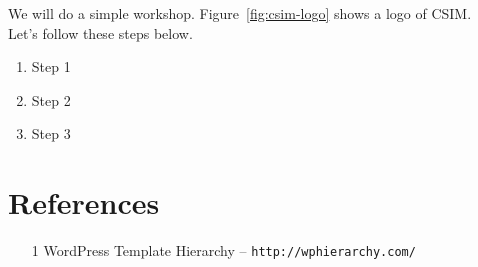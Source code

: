\documentclass{article}
\begin{document}
\noindent We will do a simple workshop. Figure~\ref{fig:csim-logo} shows
a logo of CSIM. \\

\noindent Let's follow these steps below.

\begin{enumerate}
    \item Step 1
    \item Step 2
    \item Step 3
\end{enumerate}

\section*{References}

\begin{itemize}
    \item[1] WordPress Template Hierarchy -- \tt{http://wphierarchy.com/}
\end{itemize}
\end{document}
